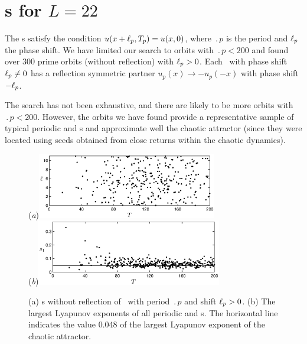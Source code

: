 \section{\Rpo s for $L=22$}
\label{sec:rpos}

The \rpo s satisfy the condition  
$u(x+\ell_p,{T_{p}}) = u(x,0)$,
where $\period{p}$ is the period and $\ell_p$ the phase shift.
We have limited our search to orbits with $\period{p} < 200$ and found
over 300 prime orbits (without reflection) with $\ell_p > 0$.  
Each \rpo\ with phase shift
$\ell_p \neq 0$ has a reflection symmetric partner
$u_p(x) \to -u_p(-x)$ with phase shift $-\ell_p$.  

The search has not been exhaustive, and there are likely to be more
orbits with $\period{p} < 200$.
However, the orbits we have found provide a representative sample of
typical periodic and \rpo s and approximate well the chaotic
attractor (since they were located using seeds obtained from close
returns within the chaotic dynamics).

\begin{figure}[t]
\begin{center}
(\textit{a})\hspace{1ex}\includegraphics[width=0.7\textwidth]{figs/ks22_rpos_Tdelta.eps}\\
(\textit{b})\includegraphics[width=0.72\textwidth]{figs/ks22_rpos_lyap.eps}
\end{center}
\caption{
(a) \Rpo s without reflection of \KSe\ with period $\period{p}$ and 
shift $\ell_p > 0$.
(b) The largest Lyapunov exponents  of all periodic
and \rpo s.  The horizontal line indicates the value 0.048 of the largest
Lyapunov exponent of the chaotic attractor.
} \label{f:ks22rposT}
\end{figure}

